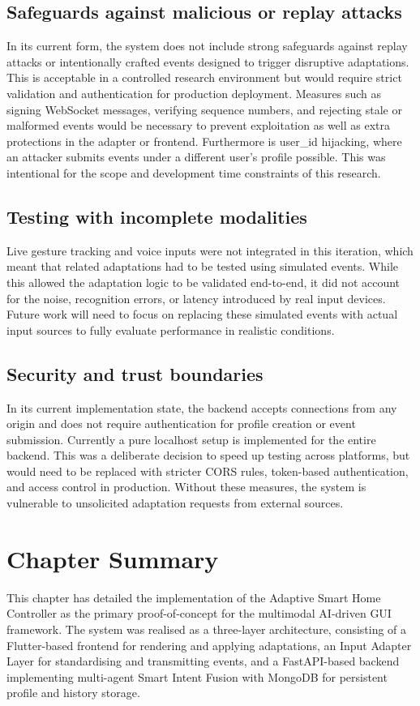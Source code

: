 \documentclass[openany]{book}
\begin{document}
\subsection{Safeguards against malicious or replay attacks}
In its current form, the system does not include strong safeguards against replay attacks or intentionally crafted events designed to trigger disruptive adaptations. This is acceptable in a controlled research environment but would require strict validation and authentication for production deployment. Measures such as signing WebSocket messages, verifying sequence numbers, and rejecting stale or malformed events would be necessary to prevent exploitation as well as extra protections in the adapter or frontend. Furthermore is user\_id hijacking, where an attacker submits events under a different user’s profile possible. This was intentional for the scope and development time constraints of this research.

\subsection{Testing with incomplete modalities}
Live gesture tracking and voice inputs were not integrated in this iteration, which meant that related adaptations had to be tested using simulated events. While this allowed the adaptation logic to be validated end-to-end, it did not account for the noise, recognition errors, or latency introduced by real input devices. Future work will need to focus on replacing these simulated events with actual input sources to fully evaluate performance in realistic conditions.

\subsection{Security and trust boundaries}
In its current implementation state, the backend accepts connections from any origin and does not require authentication for profile creation or event submission. Currently a pure localhost setup is implemented for the entire backend. This was a deliberate decision to speed up testing across platforms, but would need to be replaced with stricter CORS rules, token-based authentication, and access control in production. Without these measures, the system is vulnerable to unsolicited adaptation requests from external sources.

\section{Chapter Summary}
This chapter has detailed the implementation of the Adaptive Smart Home Controller as the primary proof-of-concept for the multimodal AI-driven GUI framework. The system was realised as a three-layer architecture, consisting of a Flutter-based frontend for rendering and applying adaptations, an Input Adapter Layer for standardising and transmitting events, and a FastAPI-based backend implementing multi-agent Smart Intent Fusion with MongoDB for persistent profile and history storage.
\end{document}
